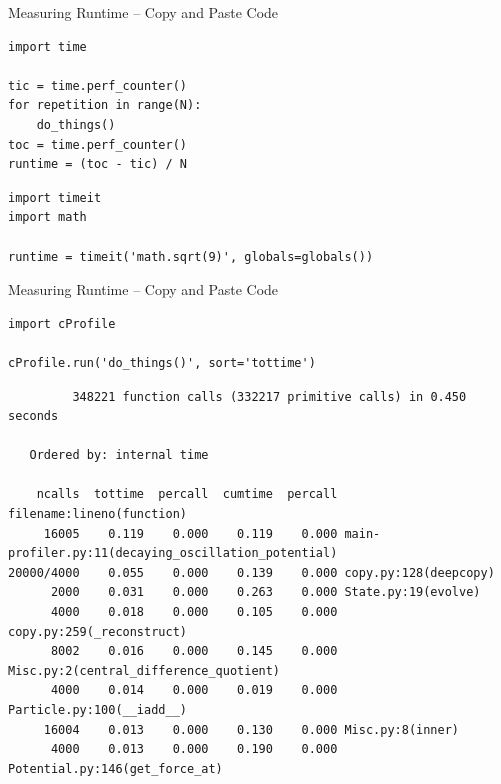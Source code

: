 \begin{frame}[fragile]{Measuring Runtime -- Copy and Paste Code}
%
\begin{codebox}
\begin{verbatim}
import time

tic = time.perf_counter()
for repetition in range(N):
    do_things()
toc = time.perf_counter()
runtime = (toc - tic) / N
\end{verbatim}
\end{codebox}
%
\begin{codebox}
\begin{verbatim}
import timeit
import math

runtime = timeit('math.sqrt(9)', globals=globals())
\end{verbatim}
\end{codebox}
%
\end{frame}


\begin{frame}[fragile]{Measuring Runtime -- Copy and Paste Code}
%
\begin{codebox}
\begin{verbatim}
import cProfile

cProfile.run('do_things()', sort='tottime')
\end{verbatim}
\end{codebox}
%
\begin{cmdbox}
\begin{verbatim}
         348221 function calls (332217 primitive calls) in 0.450 seconds

   Ordered by: internal time

    ncalls  tottime  percall  cumtime  percall filename:lineno(function)
     16005    0.119    0.000    0.119    0.000 main-profiler.py:11(decaying_oscillation_potential)
20000/4000    0.055    0.000    0.139    0.000 copy.py:128(deepcopy)
      2000    0.031    0.000    0.263    0.000 State.py:19(evolve)
      4000    0.018    0.000    0.105    0.000 copy.py:259(_reconstruct)
      8002    0.016    0.000    0.145    0.000 Misc.py:2(central_difference_quotient)
      4000    0.014    0.000    0.019    0.000 Particle.py:100(__iadd__)
     16004    0.013    0.000    0.130    0.000 Misc.py:8(inner)
      4000    0.013    0.000    0.190    0.000 Potential.py:146(get_force_at)
\end{verbatim}
\end{cmdbox}
%
\end{frame}

